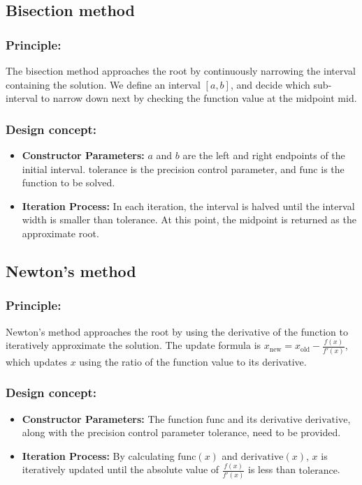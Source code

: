 \documentclass[a4paper]{article}
\begin{document}
\subsection*{Bisection method}
\subsubsection*{Principle:} The bisection method approaches the root by continuously narrowing the interval containing the solution. We define an interval \([a, b]\), and decide which sub-interval to narrow down next by checking the function value at the midpoint \(\text{mid}\).

\subsubsection*{Design concept:}
\begin{itemize}
    \item \textbf{Constructor Parameters:} \(a\) and \(b\) are the left and right endpoints of the initial interval. \(\text{tolerance}\) is the precision control parameter, and \(\text{func}\) is the function to be solved.
    \item \textbf{Iteration Process:} In each iteration, the interval is halved until the interval width is smaller than \(\text{tolerance}\). At this point, the midpoint is returned as the approximate root.
\end{itemize}
\subsection*{Newton's method}
\subsubsection*{Principle:} Newton's method approaches the root by using the derivative of the function to iteratively approximate the solution. The update formula is \(x_{\text{new}} = x_{\text{old}} - \frac{f(x)}{f'(x)}\), which updates \(x\) using the ratio of the function value to its derivative.

\subsubsection*{Design concept:}
\begin{itemize}
    \item \textbf{Constructor Parameters:} The function \( \text{func} \) and its derivative \( \text{derivative} \), along with the precision control parameter \( \text{tolerance} \), need to be provided.
    \item \textbf{Iteration Process:} By calculating \( \text{func}(x) \) and \( \text{derivative}(x) \), \(x\) is iteratively updated until the absolute value of \( \frac{f(x)}{f'(x)} \) is less than \( \text{tolerance} \).
\end{itemize}
\end{document}

